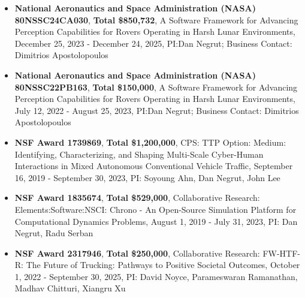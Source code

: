 



\begin{footnotesize}

\begin{itemize}[leftmargin=2ex, nosep, noitemsep]
	\item {\textbf{National Aeronautics and Space Administration (NASA) 80NSSC24CA030}, \textbf{Total \$850,732}, A Software Framework for Advancing Perception Capabilities for Rovers Operating in Harsh Lunar Environments, December 25, 2023 - December 24, 2025, PI:Dan Negrut; Business Contact: Dimitrios Apostolopoulos}
	
	\item {\textbf{National Aeronautics and Space Administration (NASA) 80NSSC22PB163}, \textbf{Total \$150,000}, A Software Framework for Advancing Perception Capabilities for Rovers Operating in Harsh Lunar Environments, July 12, 2022 - August 25, 2023, PI:Dan Negrut; Business Contact: Dimitrios Apostolopoulos}
	
	\item {\textbf{NSF Award 1739869}, \textbf{Total \$1,200,000}, CPS: TTP Option: Medium: Identifying, Characterizing, and Shaping Multi-Scale Cyber-Human Interactions in Mixed Autonomous Conventional Vehicle Traffic, September 16, 2019 - September 30, 2023, PI: Soyoung Ahn, Dan Negrut, John Lee}

	\item {\textbf{NSF Award 1835674}, \textbf{Total \$529,000}, Collaborative Research: Elements:Software:NSCI: Chrono - An Open-Source Simulation Platform for Computational Dynamics Problems, August 1, 2019 - July 31, 2023, PI: Dan Negrut, Radu Serban}
	
	\item {\textbf{NSF Award 2317946}, \textbf{Total \$250,000}, 	Collaborative Research: FW-HTF-R: The Future of Trucking: Pathways to Positive Societal Outcomes, October 1, 2022 - September 30, 2025, PI: David Noyce, Parameswaran Ramanathan, Madhav Chitturi, Xiangru Xu}

	

\end{itemize}
	
\end{footnotesize}


